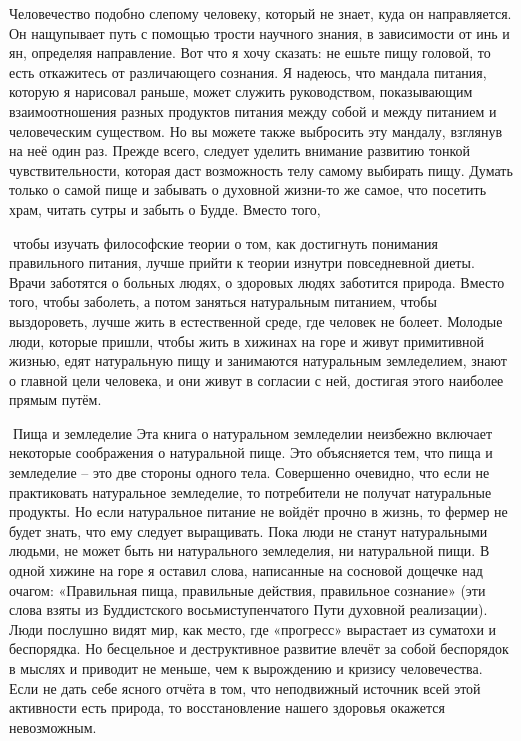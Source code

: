 \documentclass[a4paper]{book}
\begin{document}
Человечество подобно слепому человеку, который не знает, куда он направляется. Он
нащупывает путь с помощью трости научного знания, в зависимости от инь и ян, определяя
направление.
Вот что я хочу сказать: не ешьте пищу головой, то есть откажитесь от различающего
сознания. Я надеюсь, что мандала питания, которую я нарисовал раньше, может служить
руководством, показывающим взаимоотношения разных продуктов питания между собой и
между питанием и человеческим существом. Но вы можете также выбросить эту мандалу,
взглянув на неё один раз.
Прежде всего, следует уделить внимание развитию тонкой чувствительности, которая
даст возможность телу самому выбирать пищу. Думать только о самой пище и забывать о
духовной жизни-то же самое, что посетить храм, читать сутры и забыть о Будде. Вместо того,

чтобы изучать философские теории о том, как достигнуть понимания правильного питания,
лучше прийти к теории изнутри повседневной диеты.
Врачи заботятся о больных людях, о здоровых людях заботится природа. Вместо того,
чтобы заболеть, а потом заняться натуральным питанием, чтобы выздороветь, лучше жить в
естественной среде, где человек не болеет.
Молодые люди, которые пришли, чтобы жить в хижинах на горе и живут примитивной
жизнью, едят натуральную пищу и занимаются натуральным земледелием, знают о главной
цели человека, и они живут в согласии с ней, достигая этого наиболее прямым путём.

Пища и земледелие
Эта книга о натуральном земледелии неизбежно включает некоторые соображения о
натуральной пище. Это объясняется тем, что пища и земледелие – это две стороны одного
тела. Совершенно очевидно, что если не практиковать натуральное земледелие, то
потребители не получат натуральные продукты. Но если натуральное питание не войдёт
прочно в жизнь, то фермер не будет знать, что ему следует выращивать.
Пока люди не станут натуральными людьми, не может быть ни натурального
земледелия, ни натуральной пищи. В одной хижине на горе я оставил слова, написанные на
сосновой дощечке над очагом: «Правильная пища, правильные действия, правильное
сознание» (эти слова взяты из Буддистского восьмиступенчатого Пути духовной реализации).
Люди послушно видят мир, как место, где «прогресс» вырастает из суматохи и
беспорядка. Но бесцельное и деструктивное развитие влечёт за собой беспорядок в мыслях и
приводит не меньше, чем к вырождению и кризису человечества. Если не дать себе ясного
отчёта в том, что неподвижный источник всей этой активности есть природа, то
восстановление нашего здоровья окажется невозможным.
\end{document}
